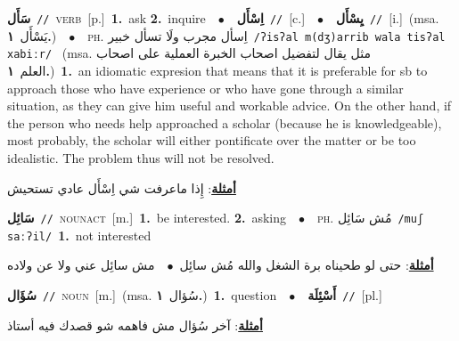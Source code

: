\documentclass[10pt,a4paper,twoside]{article} %
\begin{document}
\begin{multicols}{2}
{\setlength\topsep{0pt}\textbf{\foreignlanguage{arabic}{سَأَل}}\ {\color{gray}\texttt{//}\color{black}}\ \textsc{verb}\ [p.]\ \textbf{1.}~ask  \textbf{2.}~inquire\ \ $\bullet$\ \ \setlength\topsep{0pt}\textbf{\foreignlanguage{arabic}{اِسْأَل}}\ {\color{gray}\texttt{//}\color{black}}\ [c.]\ \ $\bullet$\ \ \setlength\topsep{0pt}\textbf{\foreignlanguage{arabic}{يِسْأَل}}\ {\color{gray}\texttt{//}\color{black}}\ [i.]\ \color{gray}(msa. \foreignlanguage{arabic}{يَسْأَل}~\foreignlanguage{arabic}{\textbf{١.}})\color{black}\ \ $\bullet$\ \ \textsc{ph.} \color{gray} \foreignlanguage{arabic}{اِسأل مجرب ولَا تسأل خبير}\color{black}\ {\color{gray}\texttt{/{\sffamily ʔisʔal m(dʒ)arrib wala tisʔal xabiːr}/}\color{black}}\ \color{gray} (msa. \foreignlanguage{arabic}{مثل يقال لتفضيل اصحاب الخبرة العملية على اصحاب العلم}~\foreignlanguage{arabic}{\textbf{١.}})\color{black}\ \textbf{1.}~an idiomatic expresion that means that it is preferable for sb to approach those who have experience or who have gone through a similar situation, as they can give him useful and workable advice. On the other hand, if the person who needs help approached a scholar (because he is knowledgeable), most probably, the scholar will either pontificate over the matter or be too idealistic. The problem thus will not be resolved.\  \begin{flushright}\color{gray}\foreignlanguage{arabic}{\textbf{\underline{\foreignlanguage{arabic}{أمثلة}}}: إِذا ماعرفت شي اِسْأَل عادي تستحيش}\end{flushright}\color{black}} \vspace{2mm}

{\setlength\topsep{0pt}\textbf{\foreignlanguage{arabic}{سَائِل}}\ {\color{gray}\texttt{//}\color{black}}\ \textsc{noun\textunderscore act}\ [m.]\ \textbf{1.}~be interested.  \textbf{2.}~asking\ \ $\bullet$\ \ \textsc{ph.} \color{gray} \foreignlanguage{arabic}{مُش سَائِل}\color{black}\ {\color{gray}\texttt{/{\sffamily muʃ saːʔil}/}\color{black}}\ \textbf{1.}~not interested\  \begin{flushright}\color{gray}\foreignlanguage{arabic}{\textbf{\underline{\foreignlanguage{arabic}{أمثلة}}}: حتى لو طحيناه برة الشغل والله مُش سائِل\ $\bullet$\ \  مش سائِل عني ولا عن ولاده}\end{flushright}\color{black}} \vspace{2mm}

{\setlength\topsep{0pt}\textbf{\foreignlanguage{arabic}{سُؤَال}}\ {\color{gray}\texttt{//}\color{black}}\ \textsc{noun}\ [m.]\ \color{gray}(msa. \foreignlanguage{arabic}{سُؤال}~\foreignlanguage{arabic}{\textbf{١.}})\color{black}\ \textbf{1.}~question\ \ $\bullet$\ \ \setlength\topsep{0pt}\textbf{\foreignlanguage{arabic}{أَسْئِلَة}}\ {\color{gray}\texttt{//}\color{black}}\ [pl.]\  \begin{flushright}\color{gray}\foreignlanguage{arabic}{\textbf{\underline{\foreignlanguage{arabic}{أمثلة}}}: آخر سُؤال مش فاهمه شو قصدك فيه أستاذ}\end{flushright}\color{black}} \vspace{2mm}


\end{multicols}
\end{document}
